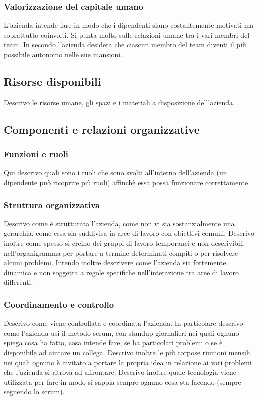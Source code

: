 			\subsubsection{Valorizzazione del capitale umano}
				L'azienda intende fare in modo che i dipendenti siano costantemente motivati ma soprattutto coinvolti. Si punta
				molto sulle relazioni umane tra i vari membri del team. In secondo l'azienda desidera che ciascun membro del team
				diventi il più possibile autonomo nelle sue mansioni.
		\subsection{Risorse disponibili}
			Descrivo le risorse umane, gli spazi e i materiali a disposizione dell'azienda.
		\subsection{Componenti e relazioni organizzative}
			\subsubsection{Funzioni e ruoli}
				Qui descrivo quali sono i ruoli che sono svolti all'interno dell'azienda (un dipendente può ricoprire più ruoli)
				affinchè essa possa funzionare correttamente
			\subsubsection{Struttura organizzativa}
				Descrivo come è strutturata l'azienda, come non vi sia sostanzialmente una gerarchia, come essa sia suddivisa in
				aree di lavoro con obiettivi comuni. Descrivo inoltre come spesso si creino dei gruppi di lavoro temporanei e non
				descrivibili nell'organigramma per portare a termine determinati compiti o per risolvere alcuni problemi. Intendo
				inoltre descrivere come l'azienda sia fortemente dinamica e non soggetta a regole specifiche nell'interazione tra
				aree di lavoro differenti.
			\subsubsection{Coordinamento e controllo}
				Descrivo come viene controllata e coordinata l'azienda. In particolare descrivo come l'azienda usi il metodo scrum,
				con standup giornalieri nei quali ognuno spiega cosa ha fatto, cosa intende fare, se ha particolari problemi o se è
				disponibile ad aiutare un collega. Descrivo inoltre le più corpose riunioni mensili nei quali ognuno è invitato a
				portare la propria idea in relazione ai vari problemi che l'azienda si ritrova ad affrontare. Descrivo inoltre quale
				tecnologia viene utilizzata per fare in modo si sappia sempre ognuno cosa sta facendo (sempre seguendo lo scrum).
